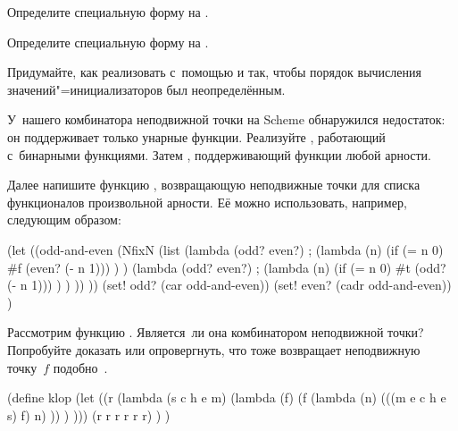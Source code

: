 \begin{exercise}\label{lisp1-2-omega/ex:label}
Определите специальную форму  на .
\end{exercise}

\begin{exercise}\label{lisp1-2-omega/ex:labels}
Определите специальную форму  на .
\end{exercise}

\begin{exercise}\label{lisp1-2-omega/ex:orderless-letrec}
Придумайте, как реализовать  с~помощью  и  так,
чтобы порядок вычисления значений"=инициализаторов был неопределённым.
\end{exercise}

\begin{exercise}\label{lisp1-2-omega/ex:fixn}
У~нашего комбинатора неподвижной точки на Scheme обнаружился недостаток: он
поддерживает только унарные функции. Реализуйте , работающий
с~бинарными функциями. Затем , поддерживающий функции любой арности.
\end{exercise}

\begin{exercise}\label{lisp1-2-omega/ex:nfixn}
Далее напишите функцию , возвращающую неподвижные точки для списка
функционалов произвольной арности. Её можно использовать, например, следующим
образом:

\begin{code:lisp}
(let ((odd-and-even
       (NfixN (list (lambda (odd? even?)    ; 
                      (lambda (n)
                        (if (= n 0) #f (even? (- n 1))) ) )
                    (lambda (odd? even?)    ; 
                      (lambda (n)
                        (if (= n 0) #t (odd? (- n 1))) ) ) )) ))
  (set! odd? (car odd-and-even))
  (set! even? (cadr odd-and-even)) )
\end{code:lisp}
\end{exercise}

\begin{exercise}\label{lisp1-2-omega/ex:klop}
Рассмотрим функцию . Является~ли она комбинатором неподвижной точки?
Попробуйте доказать или опровергнуть, что  тоже возвращает
неподвижную точку~$f$ подобно~.

\begin{code:lisp}
(define klop
  (let ((r (lambda (s c h e m)
             (lambda (f)
               (f (lambda (n)
                    (((m e c h e s) f) n) )) ) )))
    (r r r r r r) ) )
\end{code:lisp}
\end{exercise}

